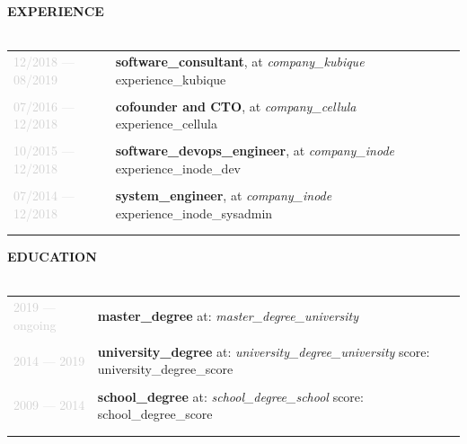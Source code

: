 \documentclass{article}
\begin{document}
\textbf{\textcolor{deepblue}{\uppercase{{{experience}}}}} \\\\ \hfill
\begin{tabular}{ R{3cm} L{12cm} }
	\textcolor{lightgray}{12/2018 — 08/2019} &
		\textbf{{{software_consultant}}}, \MakeLowercase{{{at}}} \textit{{{company_kubique}}} \linebreak
		{{experience_kubique}} \\\\ \hfill
	\textcolor{lightgray}{07/2016 — 12/2018} &
		\textbf{{{cofounder}} {{and}} CTO}, \MakeLowercase{{{at}}} \textit{{{company_cellula}}} \linebreak
		{{experience_cellula}} \\\\ \hfill
	\textcolor{lightgray}{10/2015 — 12/2018} &
		\textbf{{{software_devops_engineer}}}, \MakeLowercase{{{at}}} \textit{{{company_inode}}} \linebreak
		{{experience_inode_dev}} \\\\ \hfill
	\textcolor{lightgray}{07/2014 — 12/2018} &
		\textbf{{{system_engineer}}}, \MakeLowercase{{{at}}} \textit{{{company_inode}}} \linebreak
		{{experience_inode_sysadmin}} \\\\ \hfill
\end{tabular}

\textbf{\textcolor{deepblue}{\uppercase{{{education}}}}} \\\\ \hfill
\begin{tabular}{ R{3cm} L{12cm} }
	\textcolor{lightgray}{2019 — {{ongoing}}} &
		\textbf{{{master_degree}}} \linebreak
		{{at}}: \textit{{{master_degree_university}}} \\\\ \hfill
	\textcolor{lightgray}{2014 — 2019} &
		\textbf{{{university_degree}}} \linebreak
		{{at}}: \textit{{{university_degree_university}}} \linebreak
		{{score}}: {{university_degree_score}} \\\\ \hfill
	\textcolor{lightgray}{2009 — 2014} &
		\textbf{{{school_degree}}} \linebreak
		{{at}}: \textit{{{school_degree_school}}} \linebreak
		{{score}}: {{school_degree_score}} \\\\ \hfill
\end{tabular}
\end{document}

